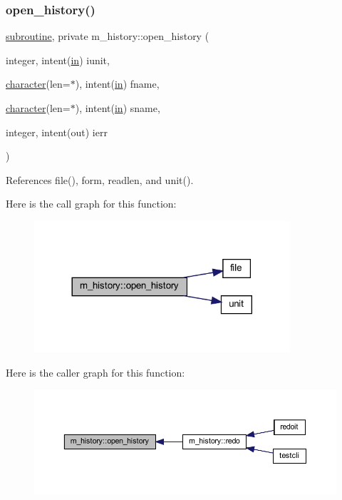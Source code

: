 \subsubsection{\texorpdfstring{open\+\_\+history()}{open\_history()}}
{\footnotesize\ttfamily \hyperlink{M__stopwatch_83_8txt_acfbcff50169d691ff02d4a123ed70482}{subroutine}, private m\+\_\+history\+::open\+\_\+history (\begin{DoxyParamCaption}\item[{integer, intent(\hyperlink{M__journal_83_8txt_afce72651d1eed785a2132bee863b2f38}{in})}]{iunit,  }\item[{\hyperlink{option__stopwatch_83_8txt_abd4b21fbbd175834027b5224bfe97e66}{character}(len=$\ast$), intent(\hyperlink{M__journal_83_8txt_afce72651d1eed785a2132bee863b2f38}{in})}]{fname,  }\item[{\hyperlink{option__stopwatch_83_8txt_abd4b21fbbd175834027b5224bfe97e66}{character}(len=$\ast$), intent(\hyperlink{M__journal_83_8txt_afce72651d1eed785a2132bee863b2f38}{in})}]{sname,  }\item[{integer, intent(out)}]{ierr }\end{DoxyParamCaption})\hspace{0.3cm}{\ttfamily [private]}}



References file(), form, readlen, and unit().

Here is the call graph for this function\+:
\nopagebreak
\begin{figure}[H]
\begin{center}
\leavevmode
\includegraphics[width=269pt]{namespacem__history_ac181d59688bc06d4ba7465841721e766_cgraph}
\end{center}
\end{figure}
Here is the caller graph for this function\+:
\nopagebreak
\begin{figure}[H]
\begin{center}
\leavevmode
\includegraphics[width=350pt]{namespacem__history_ac181d59688bc06d4ba7465841721e766_icgraph}
\end{center}
\end{figure}
\mbox{\label{namespacem__history_a1abbc2c426b89526939d4389c9d3e391}} 
